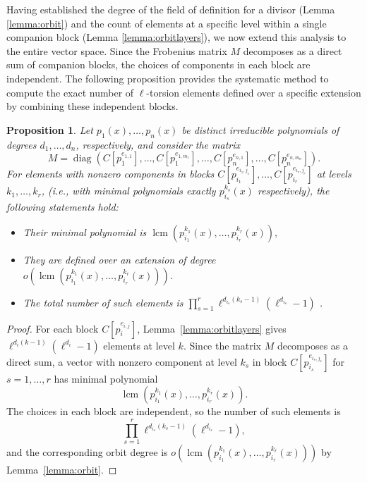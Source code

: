 \documentclass[11pt,a4paper]{article}
\theoremstyle{plain}
\newtheorem{proposition}[theorem]{Proposition}
\theoremstyle{definition}
\theoremstyle{remark}
\begin{document}
Having established the degree of the field of definition for a divisor (Lemma \ref{lemma:orbit}) and the count of elements at a specific level within a single companion block (Lemma \ref{lemma:orbitlayers}), we now extend this analysis to the entire vector space. Since the Frobenius matrix $M$ decomposes as a direct sum of companion blocks, the choices of components in each block are independent. 
The following proposition provides the systematic method to compute the exact number of $\ell$-torsion elements defined over a specific extension by combining these independent blocks.


\begin{proposition}\label{prop:galois_orbits}
 Let $p_1(x),\dots,p_n(x)$ be distinct irreducible polynomials of degrees 
$d_1,\dots,d_n$, respectively, and consider the  matrix $$M=\operatorname{diag}\!\left(
C[p_1^{e_{1,1}}],\dots,C[p_1^{e_{1,m_1}}],
\dots,
C[p_n^{e_{n,1}}],\dots,C[p_n^{e_{n,m_n}}]
\right).$$
For elements with nonzero components in blocks 
$C[p_{i_1}^{e_{i_1,j_1}}],\dots,C[p_{i_r}^{e_{i_r,j_r}}]$ 
at levels $k_1,\dots,k_r$, (i.e., with minimal 
polynomials exactly $p_{i_s}^{k_s}(x)$ respectively), the following statements hold:
\begin{itemize}
    \item [(i)] Their minimal polynomial is $\operatorname{lcm}\!\left(p_{i_1}^{k_1}(x),\dots,p_{i_r}^{k_r}(x)\right),$

\item [(ii)] They are defined over an extension of degree
$o\!\left(\operatorname{lcm}\!\left(p_{i_1}^{k_1}(x),
\dots,p_{i_r}^{k_r}(x)\right)\right)$. 

\item[(iii)] The total number of such elements is $\prod_{s=1}^{r}\ell^{d_{i_s}(k_s-1)}(\ell^{d_{i_s}}-1)$ .
\end{itemize}


\end{proposition}



\begin{proof}

 For each block $C[p_i^{e_{i,j}}]$, Lemma~\ref{lemma:orbitlayers} gives 
$\ell^{d_i(k-1)}(\ell^{d_i}-1)$ elements at level $k$. Since the matrix $M$ decomposes as a direct sum, a vector with nonzero component at level $k_s$ in block $C[p_{i_s}^{e_{i_s,j_s}}]$ for $s=1,\dots,r$ 
has minimal polynomial
\[
\operatorname{lcm}\left(p_{i_1}^{k_1}(x),\dots,p_{i_r}^{k_r}(x)\right).
\]
The choices in each block are independent, so the number of such elements is
\[
\prod_{s=1}^{r}\ell^{d_{i_s}(k_s-1)}(\ell^{d_{i_s}}-1),
\]
and the corresponding orbit degree is 
$o\!\left(\operatorname{lcm}\left(p_{i_1}^{k_1}(x),\dots,
p_{i_r}^{k_r}(x)\right)\right)$ by Lemma~\ref{lemma:orbit}.\end{proof}
\end{document}
